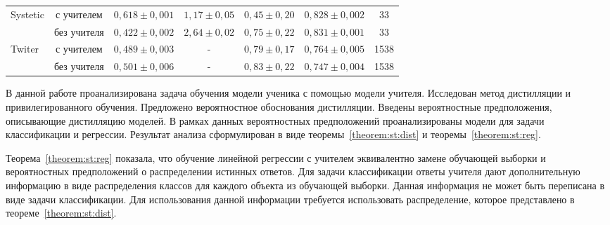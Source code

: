 \documentclass[12pt]{a&t}
\begin{document}
\begin{table}[]
\begin{center}
{\begin{tabular}{|l|c|c|c|c|c|c|}
\multirow{2}{*}{Systetic}     & с учителем  & $0{,}618\pm0{,}001$                                                & $1{,}17\pm0{,}05$                                                                             & $0{,}45\pm0{,}20$                                               & $0{,}828\pm0{,}002$ & 33                                                         \\ \cline{2-7} 
                              & без учителя & $0{,}422\pm0{,}002$                                                & $2{,}64\pm0{,}02$                                                                             & $0{,}75\pm0{,}22$                                               & $0{,}831\pm0{,}001$ & 33                                                         \\ \hline \hline
\multirow{2}{*}{Twiter}       & с учителем  & $0{,}489\pm0{,}003$                                               & -                                                                                             & $0{,}79\pm0{,}17$                                               & $0{,}764\pm0{,}005$ & 1538                                                       \\ \cline{2-7} 
                              & без учителя &  $0{,}501\pm0{,}006$                                                & -                                                                                             & $0{,}83\pm0{,}22$                                               & $0{,}747\pm0{,}004$ & 1538                                                       \\ \hline 
\end{tabular}
}
\end{center}
\end{table}


В данной работе проанализирована задача обучения модели ученика с помощью модели учителя.
Исследован метод дистилляции и привилегированного обучения.
Предложено вероятностное обоснования дистилляции.
Введены вероятностные предположения, описывающие дистилляцию моделей.
В рамках данных вероятностных предположений проанализированы модели для задачи классификации и регрессии. Результат анализа сформулирован в виде теоремы~\ref{theorem:st:dist} и теоремы~\ref{theorem:st:reg}.

Теорема~\ref{theorem:st:reg} показала, что обучение линейной регрессии с учителем эквивалентно замене обучающей выборки и вероятностных предположений о распределении истинных ответов. Для задачи классификации ответы учителя дают дополнительную информацию в виде распределения классов для каждого объекта из обучающей выборки. Данная информация не может быть переписана в виде задачи классификации. Для использования данной информации требуется использовать распределение, которое представлено в теореме~\ref{theorem:st:dist}.
\end{document}
